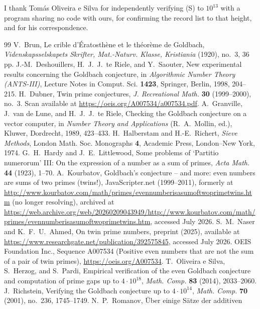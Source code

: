 \documentclass[10pt]{article}
\theoremstyle{definition}
\theoremstyle{remark}
\begin{document}
I thank Tom\'as Oliveira e Silva for independently verifying (S) to $10^{13}$
with a program sharing no code with ours, for confirming the record list to
that height, and for his correspondence.

\small
\begin{thebibliography}{99}
 V.~Brun, Le crible d'\'Eratosth\`ene et le th\'eor\`eme de
Goldbach, \emph{Videnskapsselskapets Skrifter, Mat.-Naturv. Klasse,
Kristiania} (1920), no.~3, 36 pp.
 J.-M.~Deshouillers, H.~J.~J.~te Riele, and Y.~Saouter, New
experimental results concerning the Goldbach conjecture, in
\emph{Algorithmic Number Theory (ANTS-III)}, Lecture Notes in Comput.
Sci. \textbf{1423}, Springer, Berlin, 1998, 204--215.
 H.~Dubner, Twin prime conjectures,
\emph{J. Recreational Math.} \textbf{30} (1999--2000), no.~3.
Scan available at \url{https://oeis.org/A007534/a007534.pdf}.
 A.~Granville, J.~van de Lune, and H.~J.~J.~te Riele,
Checking the Goldbach conjecture on a vector computer, in \emph{Number
Theory and Applications} (R.~A.~Mollin, ed.), Kluwer, Dordrecht, 1989,
423--433.
 H.~Halberstam and H.-E.~Richert, \emph{Sieve Methods},
London Math. Soc. Monographs \textbf{4}, Academic Press, London--New York,
1974.
 G.~H.~Hardy and J.~E.~Littlewood, Some problems of `Partitio
numerorum' III: On the expression of a number as a sum of primes,
\emph{Acta Math.} \textbf{44} (1923), 1--70.
 A.~Kourbatov, Goldbach's conjecture -- and more: even
numbers are sums of two primes (twins!), JavaScripter.net (1999--2011),
formerly at
\url{http://www.kourbatov.com/math/primes/evennumberisasumoftwoprimetwins.htm}
(no longer resolving), archived at
\url{https://web.archive.org/web/20260209043949/http://www.kourbatov.com/math/primes/evennumberisasumoftwoprimetwins.htm},
accessed July 2026.
 S.~M.~Naser and K.~F.~U.~Ahmed, On twin prime numbers,
preprint (2025), available at
\url{https://www.researchgate.net/publication/392575845}, accessed July
2026.
 OEIS Foundation Inc., Sequence A007534 (Positive even
numbers that are not the sum of a pair of twin primes),
\url{https://oeis.org/A007534}.
 T.~Oliveira e Silva, S.~Herzog, and S.~Pardi, Empirical
verification of the even Goldbach conjecture and computation of prime
gaps up to $4 \cdot 10^{18}$, \emph{Math. Comp.} \textbf{83} (2014),
2033--2060.
 J.~Richstein, Verifying the Goldbach conjecture up to
$4 \cdot 10^{14}$, \emph{Math. Comp.} \textbf{70} (2001), no.~236,
1745--1749.
 N.~P.~Romanov, \"Uber einige S\"atze der additiven

\end{thebibliography}
\end{document}
